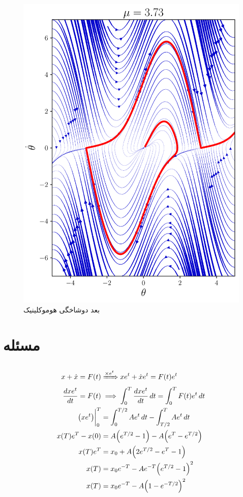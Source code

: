 \documentclass[12pt,a4paper]{article}
\begin{document}
	\begin{figure}[h!]
		\centering
		\includegraphics[width=\linewidth]{fig/8.4.4.mu3.73}
		\caption{بعد دوشاخگی هوموکلینیک}
	\end{figure}
	\restoregeometry
	\section{مسئله }
	\subsection{}
	\begin{align}
		x + \dot{x} = F(t) &\xRightarrow{\times e^{t}} xe^t + \dot{x}e^t = F(t)e^t \\
		\dv{xe^t}{t} = F(t) &\implies \int_0^T \dv{xe^t}{t} \dd{t} = \int_0^T F(t)e^t \dd{t} \\
		\eval{\qty(xe^t)}_0^T &= \int_{0}^{T/2}Ae^t\dd{t} - \int_{T/2}^T Ae^t\dd{t} \\
		x(T)e^T - x(0) &= A\qty(e^{T/2} - 1) - A\qty(e^T - e^{T/2}) \\
		x(T)e^T &= x_0 + A\qty(2e^{T/2} - e^T - 1) \\
		x(T) &= x_0e^{-T} - Ae^{-T}\qty(e^{T/2} - 1)^2 \\
		x(T) &= x_0e^{-T} - A\qty(1 - e^{-T/2})^2
	\end{align}
\end{document}
